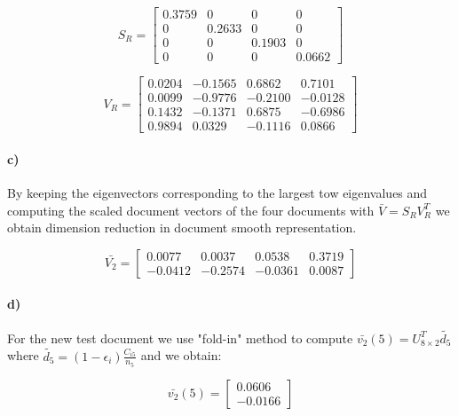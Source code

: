 \documentclass[a4paper]{article}
\begin{document}
\begin{equation}
	S_R = \begin{bmatrix}
			 0.3759   &      0    &     0    &     0 \\
		     0  &  0.2633   &      0  &       0 \\
		     0  &       0   & 0.1903  &       0 \\
		     0  &       0   &      0  &  0.0662
		\end{bmatrix}
\end{equation}

\begin{equation}
	V_R = \begin{bmatrix}
			0.0204 &  -0.1565 &   0.6862  &  0.7101 \\
			0.0099 &  -0.9776 &  -0.2100  & -0.0128 \\
			0.1432 &  -0.1371 &   0.6875  & -0.6986 \\
			0.9894 &   0.0329 &  -0.1116  & 0.0866
		\end{bmatrix}
\end{equation}
	
\paragraph{c)} By keeping the eigenvectors corresponding to the largest tow eigenvalues and computing the scaled document vectors of the four documents with $\bar{V}=S_RV_R^T$ we obtain dimension reduction in document smooth representation.

\begin{equation}
	\bar{V_2} = \begin{bmatrix}
			0.0077  &  0.0037  &  0.0538  &  0.3719 \\
			-0.0412 &  -0.2574 &  -0.0361 &   0.0087
		\end{bmatrix}
\end{equation}

\paragraph{d)} For the new test document we use "fold-in" method to compute $\bar{v_2}(5) = U_{8\times 2}^T \tilde{d_5}$ where $\tilde{d_5} = (1-\epsilon_i)\frac{C_{i5}}{n_5}$ and we obtain:

\begin{equation}
	\bar{v_2}(5) = \begin{bmatrix}
			    0.0606 \\
			   -0.0166
		\end{bmatrix}
\end{equation}
\end{document}
